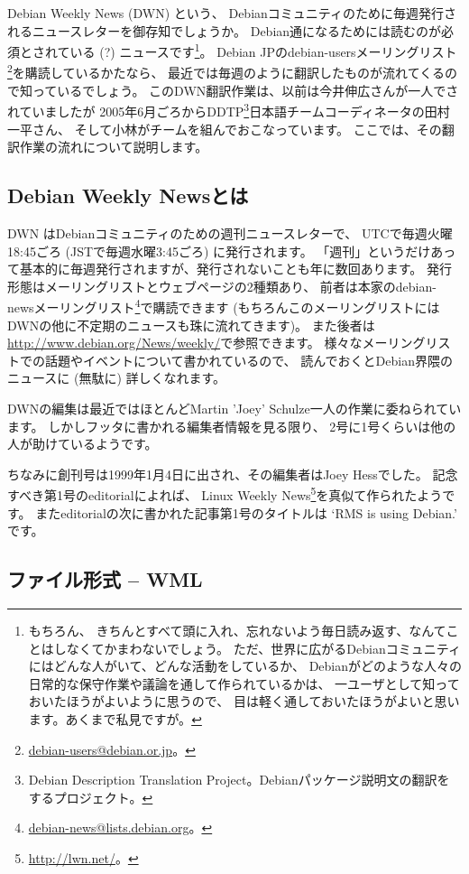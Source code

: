 \documentclass[mingoth,a4paper]{jsarticle}
\begin{document}
Debian Weekly News (DWN) という、
Debianコミュニティのために毎週発行されるニュースレターを御存知でしょうか。
Debian通になるためには読むのが必須とされている (?) ニュースです\footnote{もちろん、
きちんとすべて頭に入れ、忘れないよう毎日読み返す、なんてことはしなくてかまわないでしょう。
ただ、世界に広がるDebianコミュニティにはどんな人がいて、どんな活動をしているか、
Debianがどのような人々の日常的な保守作業や議論を通して作られているかは、
一ユーザとして知っておいたほうがよいように思うので、
目は軽く通しておいたほうがよいと思います。あくまで私見ですが。}。
Debian JPのdebian-usersメーリングリスト\footnote{\url{debian-users@debian.or.jp}。}を購読しているかたなら、
最近では毎週のように翻訳したものが流れてくるので知っているでしょう。
このDWN翻訳作業は、以前は今井伸広さんが一人でされていましたが
2005年6月ごろからDDTP\footnote{Debian Description Translation Project。Debianパッケージ説明文の翻訳をするプロジェクト。}日本語チームコーディネータの田村一平さん、
そして小林がチームを組んでおこなっています。
ここでは、その翻訳作業の流れについて説明します。

\subsection{Debian Weekly Newsとは}

DWN はDebianコミュニティのための週刊ニュースレターで、
UTCで毎週火曜18:45ごろ (JSTで毎週水曜3:45ごろ) に発行されます。
「週刊」というだけあって基本的に毎週発行されますが、発行されないことも年に数回あります。
発行形態はメーリングリストとウェブページの2種類あり、
前者は本家のdebian-newsメーリングリスト\footnote{\url{debian-news@lists.debian.org}。}で購読できます
(もちろんこのメーリングリストにはDWNの他に不定期のニュースも珠に流れてきます)。
また後者は\url{http://www.debian.org/News/weekly/}で参照できます。
様々なメーリングリストでの話題やイベントについて書かれているので、
読んでおくとDebian界隈のニュースに (無駄に) 詳しくなれます。

DWNの編集は最近ではほとんどMartin 'Joey' Schulze一人の作業に委ねられています。
しかしフッタに書かれる編集者情報を見る限り、
2号に1号くらいは他の人が助けているようです。

ちなみに創刊号は1999年1月4日に出され、その編集者はJoey Hessでした。
記念すべき第1号のeditorialによれば、
Linux Weekly News\footnote{\url{http://lwn.net/}。}を真似て作られたようです。
またeditorialの次に書かれた記事第1号のタイトルは `RMS is using Debian.' です。

\subsection{ファイル形式 -- WML}
\end{document}
